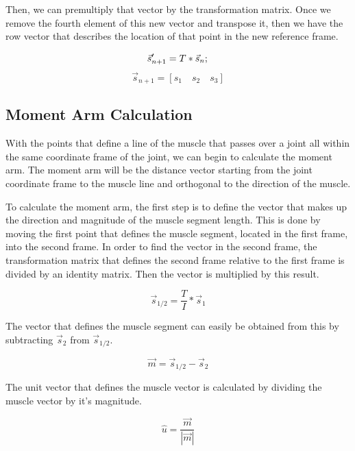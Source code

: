 \documentclass[runningheads]{llncs}
\begin{document}
Then, we can premultiply that vector by the transformation matrix. Once we remove the fourth element of this new vector and transpose it, then we have the row vector that describes the location of that point in the new reference frame.

\begin{equation}
    \Vec{s}_{n+1}' = T*\Vec{s}_n;\\
\end{equation}
\begin{equation}
    \Vec{s}_{n+1} = [s_1 \quad s_2 \quad s_3]
\end{equation}

\subsection{Moment Arm Calculation}
With the points that define a line of the muscle that passes over a joint all within the same coordinate frame of the joint, we can begin to calculate the moment arm. The moment arm will be the distance vector starting from the joint coordinate frame to the muscle line and orthogonal to the direction of the muscle.

To calculate the moment arm, the first step is to define the vector that makes up the direction and magnitude of the muscle segment length. This is done by moving the first point that defines the muscle segment, located in the first frame, into the second frame. In order to find the vector in the second frame, the transformation matrix that defines the second frame relative to the first frame is divided by an identity matrix. Then the vector is multiplied by this result.

\begin{equation}
    \Vec{s}_{1/2} = \dfrac{T}{I} * \Vec{s}_1
\end{equation}

The vector that defines the muscle segment can easily be obtained from this by subtracting $\Vec{s}_2$ from $\Vec{s}_{1/2}$.

\begin{equation}
    \Vec{m} = \Vec{s}_{1/2} - \Vec{s}_2
\end{equation}

The unit vector that defines the muscle vector is calculated by dividing the muscle vector by it's magnitude.

\begin{equation}
    \hat{u} = \dfrac{\Vec{m}}{|\Vec{m}|}
\end{equation}
\end{document}
